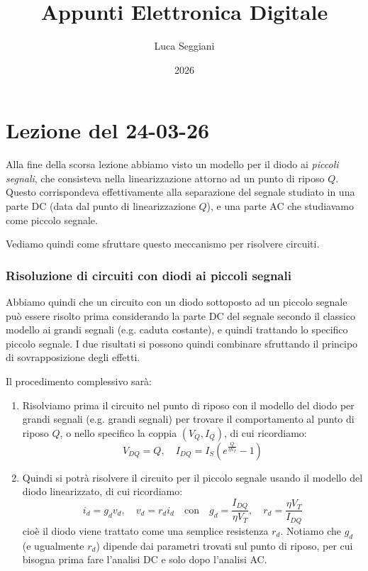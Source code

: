 \documentclass[a4paper,11pt]{article}
\title{Appunti Elettronica Digitale}
\author{Luca Seggiani}
\date{2026}
\begin{document}
\section{Lezione del 24-03-26}

\thispagestyle{empty}
\pagestyle{fancy}

Alla fine della scorsa lezione abbiamo visto un modello per il diodo ai \textit{piccoli segnali}, che consisteva nella linearizzazione attorno ad un punto di riposo $Q$. Questo corrispondeva effettivamente alla separazione del segnale studiato in una parte DC (data dal punto di linearizzazione $Q$), e una parte AC che studiavamo come piccolo segnale.

Vediamo quindi come sfruttare questo meccanismo per risolvere circuiti.

\subsubsection{Risoluzione di circuiti con diodi ai piccoli segnali}
Abbiamo quindi che un circuito con un diodo sottoposto ad un piccolo segnale può essere risolto prima considerando la parte DC del segnale secondo il classico modello ai grandi segnali (e.g. caduta costante), e quindi trattando lo specifico piccolo segnale. I due risultati si possono quindi combinare sfruttando il principo di sovrapposizione degli effetti. 

\newpage

Il procedimento complessivo sarà:
\begin{enumerate}
\item Risolviamo prima il circuito nel punto di riposo con il modello del diodo per grandi segnali (e.g. grandi segnali) per trovare il comportamento al punto di riposo $Q$, o nello specifico la coppia $(V_Q, I_Q)$, di cui ricordiamo:
$$
V_{DQ} = Q, \quad I_{DQ} = I_S \left( e^{\frac{Q}{\eta V_T}} - 1\right)
$$
\item Quindi si potrà risolvere il circuito per il piccolo segnale usando il modello del diodo linearizzato, di cui ricordiamo:
$$
i_d = g_d v_d, \quad v_d = r_d i_d \quad \text{con} \quad
g_d = \frac{I_{DQ}}{\eta V_T}, \quad r_d = \frac{\eta V_T}{I_{DQ}}
$$
cioè il diodo viene trattato come una semplice resistenza $r_d$. Notiamo che $g_d$ (e ugualmente $r_d$) dipende dai parametri trovati sul punto di riposo, per cui bisogna prima fare l'analisi DC e solo dopo l'analisi AC.
\end{enumerate}
\end{document}
